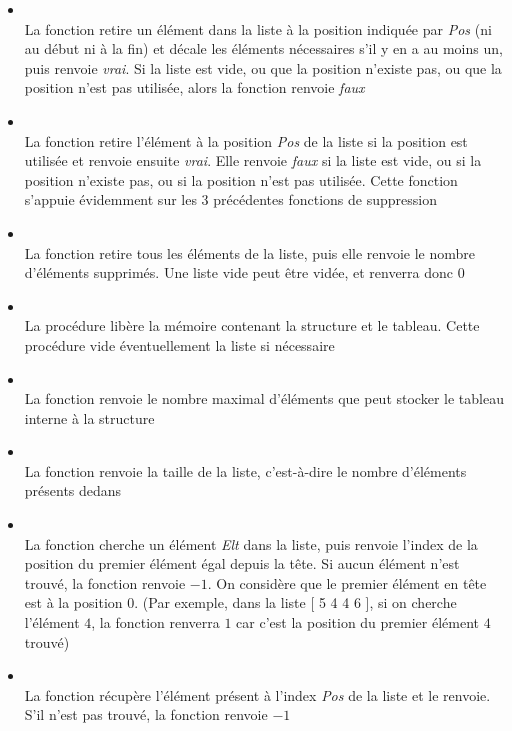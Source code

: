 \documentclass[11pt,a4paper]{article}
\begin{document}
\begin{itemize}
\item {}\\
      La fonction retire un élément dans la liste à la position indiquée par \textit{Pos} (ni au début ni à la fin) et décale les éléments nécessaires s'il y en a au moins un, puis renvoie \textit{vrai}. Si la liste est vide, ou que la position n'existe pas, ou que la position n'est pas utilisée, alors la fonction renvoie \textit{faux}
\item {}\\
      La fonction retire l'élément à la position \textit{Pos} de la liste si la position est utilisée et renvoie ensuite \textit{vrai}. Elle renvoie \textit{faux} si la liste est vide, ou si la position n'existe pas, ou si la position n'est pas utilisée. Cette fonction s'appuie évidemment sur les 3 précédentes fonctions de suppression
%
\item {}\\
      La fonction retire tous les éléments de la liste, puis elle renvoie le nombre d'éléments supprimés. Une liste vide peut être vidée, et renverra donc $ 0 $
\item {}\\
      La procédure libère la mémoire contenant la structure et le tableau. Cette procédure vide éventuellement la liste si nécessaire
%
\item {}\\
      La fonction renvoie le nombre maximal d'éléments que peut stocker le tableau interne à la structure
\item {}\\
      La fonction renvoie la taille de la liste, c'est-à-dire le nombre d'éléments présents dedans
%
\item {}\\
      La fonction cherche un élément \textit{Elt} dans la liste, puis renvoie l'index de la position du premier élément égal depuis la tête. Si aucun élément n'est trouvé, la fonction renvoie $ -1 $. On considère que le premier élément en tête est à la position $ 0 $. (Par exemple, dans la liste [ 5 4 4 6 ], si on cherche l'élément $ 4 $, la fonction renverra $ 1 $ car c'est la position du premier élément $ 4 $ trouvé)
\item {}\\
      La fonction récupère l'élément présent à l'index \textit{Pos} de la liste et le renvoie. S'il n'est pas trouvé, la fonction renvoie $ -1 $
\end{itemize}
\end{document}
